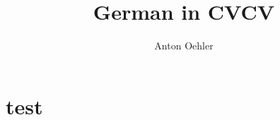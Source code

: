 \documentclass[
]{scrartcl}
\title{German in CVCV}
\author{Anton Oehler}
\begin{document}
\maketitle

\begin{abstract}

\end{abstract}

\section{test}
 
\begin{structure}
    \wordstart
    \vowel{\textschwa}
    \fen

\end{structure}
\end{document}
